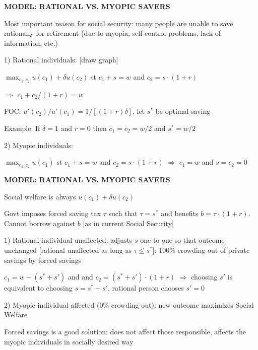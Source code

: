 \documentclass[landscape]{slides}
\begin{document}
\begin{slide}
\begin{center}
{\bf MODEL: RATIONAL VS. MYOPIC SAVERS}
\end{center}
Most important reason for social security: many people are unable to save rationally
for retirement (due to myopia, self-control problems, lack of information, etc.)

1) Rational individuals: [draw graph]


$\max_{c_1,c_2} u(c_1) + \delta u(c_2)$ st $c_1+s=w$ and $c_2=s\cdot(1+r)$

$\Rightarrow$ $c_1+c_2/(1+r)=w$

FOC: $u'(c_2)/u'(c_1)=1/[(1+r)\delta]$, let $s^*$ be optimal
saving

Example: If $\delta=1$ and $r=0$ then $c_1=c_2=w/2$ and $s^*=w/2$ 

2) Myopic individuals:

$\max_{c_1,c_2} u(c_1)$ st $c_1+s=w$ and
$c_2=s\cdot(1+r)$ $\Rightarrow$ $c_1=w$ and $s=c_2=0$

\end{slide}

\begin{slide}

\end{slide}

\begin{slide}
\begin{center}
{\bf MODEL: RATIONAL VS. MYOPIC SAVERS}
\end{center}

Social welfare is always $u(c_1) + \delta u(c_2)$

Govt imposes forced saving tax $\tau$ such that $\tau=s^*$
and benefits $b=\tau \cdot (1+r)$. Cannot borrow against $b$ [as in
current Social Security]

1) Rational individual unaffected: adjusts $s$ one-to-one so that
outcome unchanged [rational unaffected as long as $\tau \leq
s^*$]: 100\% crowding out of private savings by forced savings

\small
$c_1=w-(s^*+s')$ and and $c_2=(s^*+s')\cdot(1+r)$ $\Rightarrow$ choosing
$s'$ is equivalent to choosing $s=s^*+s'$, rational person chooses $s'=0$
\normalsize

2) Myopic individual affected (0\% crowding out): new outcome
maximizes Social Welfare

Forced savings is a good solution: does not affect those responsible,
affects the myopic individuals in socially desired way

\end{slide}
\end{document}
